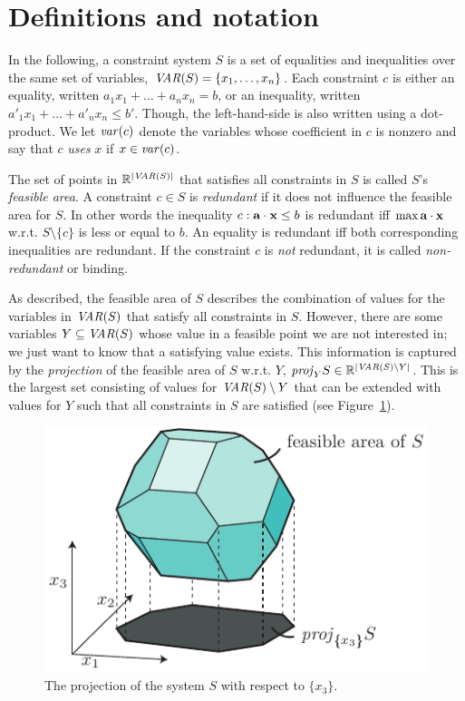 %
%
\section{Definitions and notation}
In the following, a constraint system $S$ is a set of equalities and inequalities over the same set of variables, $\mathit{VAR}(S)=\{x_1,\ldots, x_n\}$. 
Each constraint $c$ is either an equality, written $a_1x_1 + \ldots +a_nx_n = b$, or an inequality, written $a'_1x_1 + \ldots +a'_nx_n\leq b'$. Though, the left-hand-side is also written using a dot-product. 
%
We let $\mathit{var}(c)$ denote the variables whose coefficient in $c$ is nonzero and say that $c$ \emph{uses} $x$ if $x\in \mathit{var}(c)$.

The set of points in $\mathbb{R}^{|\mathit{VAR}(S)|}$ that satisfies all constraints in $S$ is called $S$'s \emph{feasible area}. A constraint $c\in S$ is \emph{redundant} if it does not influence the feasible area for $S$. In other words the inequality $c: \mathbf{a}\cdot\mathbf{x}\leq b$ is redundant iff $\max \mathbf{a}\cdot\mathbf{x}$ w.r.t. $S\setminus\{c\}$ is less or equal to $b$.
An equality is redundant iff both corresponding inequalities are redundant.
If the constraint $c$ is \emph{not} redundant, it is called \emph{non-redundant} or binding.

As described, the feasible area of $S$ describes the combination of values for the variables in $\mathit{VAR}(S)$ that satisfy all constraints in $S$. However, there are some variables $Y\subseteq \mathit{VAR}(S)$ whose value in a feasible point we are not interested in; we just want to know that a satisfying value exists. This information is captured by the \emph{projection} of the feasible area of $S$ w.r.t. $Y$, $\mathit{proj}_YS\in\mathbb{R}^{|\mathit{VAR}(S)\setminus Y|}$. This is the largest set consisting of values for $\mathit{VAR}(S)\setminus Y$ that can be extended with values for $Y$ such that all constraints in $S$ are satisfied (see Figure~\ref{fig:proj}). 

\begin{figure}
	\centering
		\includegraphics[scale=0.8]{figures/projection2.pdf}
	\caption{The projection of the system $S$ with respect to $\{x_3\}$.}
	\label{fig:proj}
\end{figure}

